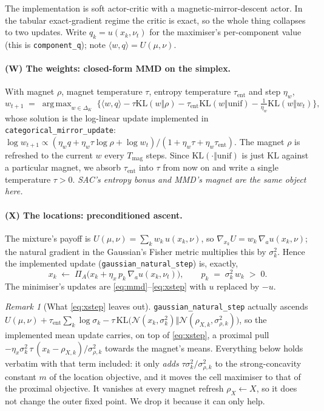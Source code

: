 \documentclass[11pt,a4paper]{article}
\theoremstyle{plain}
\theoremstyle{definition}
\theoremstyle{remark}
\newtheorem{remark}[theorem]{Remark}
\DeclareMathOperator*{\argmax}{arg\,max}
\newcommand{\KL}{\mathrm{KL}}
\newcommand{\simplex}{\Delta}
\newcommand{\ip}[2]{\langle #1, #2\rangle}
\begin{document}
The implementation is soft actor-critic with a magnetic-mirror-descent actor. In
the tabular exact-gradient regime the critic is exact, so the whole thing collapses
to two updates. Write $q_k = u(x_k,\nu_t)$ for the maximiser's per-component value
(this is \texttt{component\_q}); note $\ip{w}{q} = U(\mu,\nu)$.

\paragraph{(W) The weights: closed-form MMD on the simplex.} With magnet $\rho$,
magnet temperature $\tau$, entropy temperature $\tau_{\mathrm{ent}}$ and step $\eta_w$,
\begin{equation}\label{eq:mmd}
w_{t+1} \;=\; \argmax_{w\in\simplex_K}\;
\Big\{ \ip{w}{q} - \tau\KL(w\Vert\rho) - \tau_{\mathrm{ent}}\KL(w\Vert \mathrm{unif})
- \tfrac{1}{\eta_w}\KL(w\Vert w_t)\Big\},
\end{equation}
whose solution is the log-linear update implemented in
\texttt{categorical\_mirror\_update}:
$\log w_{t+1} \propto (\eta_w q + \eta_w\tau\log\rho + \log w_t)/(1+\eta_w\tau+\eta_w\tau_{\mathrm{ent}})$.
The magnet $\rho$ is refreshed to the current $w$ every $T_{\mathrm{mag}}$ steps.
Since $\KL(\cdot\Vert\mathrm{unif})$ is just $\KL$ against a particular magnet, we
absorb $\tau_{\mathrm{ent}}$ into $\tau$ from now on and write a single temperature
$\tau>0$. \emph{SAC's entropy bonus and MMD's magnet are the same object here.}

\paragraph{(X) The locations: preconditioned ascent.} The mixture's payoff is
$U(\mu,\nu)=\sum_k w_k\,u(x_k,\nu)$, so
$\nabla_{x_k} U = w_k\,\nabla_a u(x_k,\nu)$; the natural gradient in the Gaussian's
Fisher metric multiplies this by $\sigma_k^2$. Hence the implemented update
(\texttt{gaussian\_natural\_step}) is, exactly,
\begin{equation}\label{eq:xstep}
x_k \;\leftarrow\; \Pi_A\big(x_k + \eta_x\,p_k\,\nabla_a u(x_k,\nu_t)\big),
\qquad p_k \;=\; \sigma_k^2\,w_k \;>\;0 .
\end{equation}
The minimiser's updates are \eqref{eq:mmd}--\eqref{eq:xstep} with $u$ replaced by
$-u$.

\begin{remark}[What \eqref{eq:xstep} leaves out]\label{rem:xmagnet}
\texttt{gaussian\_natural\_step} actually ascends
$U(\mu,\nu)+\tau_{\mathrm{ent}}\sum_k\log\sigma_k
-\tau\,\KL\big(\mathcal N(x_k,\sigma_k^2)\Vert\mathcal N(\rho_{X,k},\sigma_{\rho,k}^2)\big)$,
so the implemented mean update carries, on top of \eqref{eq:xstep}, a proximal pull
$-\eta_x\sigma_k^2\,\tau\,(x_k-\rho_{X,k})/\sigma_{\rho,k}^2$ towards the magnet's
means. Everything below holds verbatim with that term included: it only \emph{adds}
$\tau\sigma_k^2/\sigma_{\rho,k}^2$ to the strong-concavity constant $m$ of the
location objective, and it moves the cell maximiser to that of the proximal
objective. It vanishes at every magnet refresh $\rho_X\leftarrow X$, so it does not
change the outer fixed point. We drop it because it can only help.
\end{remark}
\end{document}
